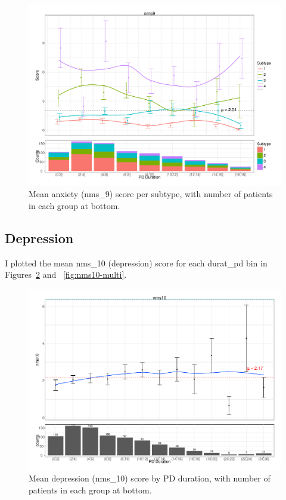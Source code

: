 \documentclass[10pt]{article}
\begin{document}
\begin{multicols}{2}
\begin{figure}[p]
  \centering
  \includegraphics[width=0.8\linewidth]{nms9-multi-durat-counts.pdf}
  \caption{Mean anxiety (nms\_9) score per subtype, with number of patients in each group at
  bottom.}
  \label{fig:nms9-multi}
\end{figure}

\subsection{Depression}
I plotted the mean nms\_10 (depression) score for each durat\_pd bin in
Figures~\ref{fig:nms10-long} and ~\ref{fig:nms10-multi}.

\begin{figure}[p]
  \centering
  \includegraphics[width=0.8\linewidth]{nms10-durat-counts.pdf}
  \caption{Mean depression (nms\_10) score by PD duration, with number of patients in each group at
  bottom.}
  \label{fig:nms10-long}
\end{figure}


\end{multicols}
\end{document}
